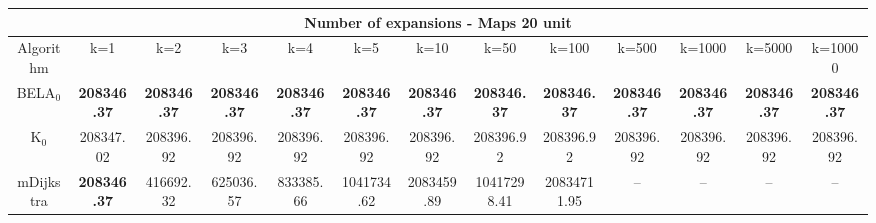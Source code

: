 \begin{tabular}{c|cccccccccccc}\toprule
\multicolumn{13}{c}{Number of expansions - Maps 20 unit}\\ \midrule
Algorithm & k=1 & k=2 & k=3 & k=4 & k=5 & k=10 & k=50 & k=100 & k=500 & k=1000 & k=5000 & k=10000 \\ \midrule
BELA$_0$ & \textbf{208346.37} & \textbf{208346.37} & \textbf{208346.37} & \textbf{208346.37} & \textbf{208346.37} & \textbf{208346.37} & \textbf{208346.37} & \textbf{208346.37} & \textbf{208346.37} & \textbf{208346.37} & \textbf{208346.37} & \textbf{208346.37} \\
K$_0$ & 208347.02 & 208396.92 & 208396.92 & 208396.92 & 208396.92 & 208396.92 & 208396.92 & 208396.92 & 208396.92 & 208396.92 & 208396.92 & 208396.92 \\
mDijkstra & \textbf{208346.37} & 416692.32 & 625036.57 & 833385.66 & 1041734.62 & 2083459.89 & 10417298.41 & 20834711.95 & -- & -- & -- & -- \\ \bottomrule 
\end{tabular}
